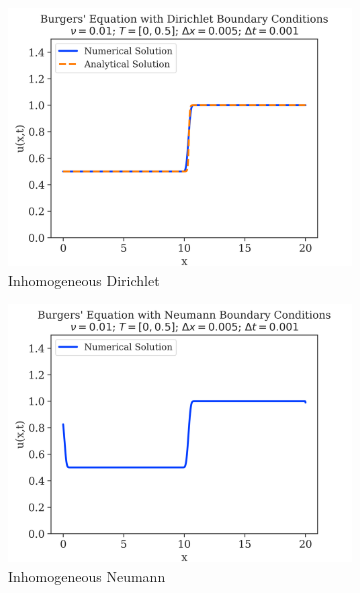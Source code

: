 \begin{figure}
	\centering
	\begin{subfigure}{0.55\linewidth}
		\centering
		\includegraphics[width=\linewidth]{../dirichlet_BC/images_nu=0.01/500_plot}
		\caption{Inhomogeneous Dirichlet}
	\end{subfigure}
	\hfill
	\begin{subfigure}{0.55\linewidth}
		\centering
		\includegraphics[width=\linewidth]{../neumann_BC/images_nu=0.01/500_plot}
		\caption{Inhomogeneous Neumann}
	\end{subfigure}
	\hfill
	\begin{subfigure}{0.55\linewidth}
		\centering

\end{subfigure}
\end{figure}
